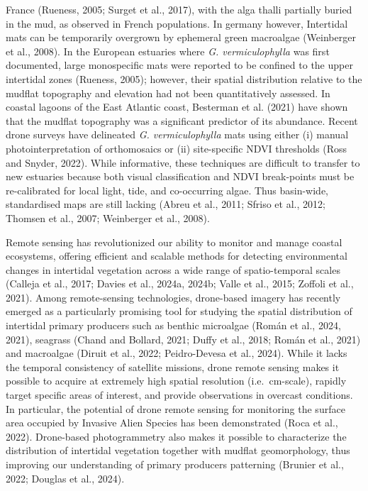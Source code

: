 \documentclass[
  letterpaper,
  DIV=11,
  numbers=noendperiod]{scrartcl}
\begin{document}
France (Rueness, 2005; Surget et al., 2017), with the alga thalli
partially buried in the mud, as observed in French populations. In
germany however, Intertidal mats can be temporarily overgrown by
ephemeral green macroalgae (Weinberger et al., 2008). In the European
estuaries where \emph{G. vermiculophylla} was first documented, large
monospecific mats were reported to be confined to the upper intertidal
zones (Rueness, 2005); however, their spatial distribution relative to
the mudflat topography and elevation had not been quantitatively
assessed. In coastal lagoons of the East Atlantic coast, Besterman et
al. (2021) have shown that the mudflat topography was a significant
predictor of its abundance. Recent drone surveys have delineated
\emph{G. vermiculophylla} mats using either (i) manual
photointerpretation of orthomosaics or (ii) site-specific NDVI
thresholds (Ross and Snyder, 2022). While informative, these techniques
are difficult to transfer to new estuaries because both visual
classification and NDVI break-points must be re-calibrated for local
light, tide, and co-occurring algae. Thus basin-wide, standardised maps
are still lacking (Abreu et al., 2011; Sfriso et al., 2012; Thomsen et
al., 2007; Weinberger et al., 2008).

Remote sensing has revolutionized our ability to monitor and manage
coastal ecosystems, offering efficient and scalable methods for
detecting environmental changes in intertidal vegetation across a wide
range of spatio-temporal scales (Calleja et al., 2017; Davies et al.,
2024a, 2024b; Valle et al., 2015; Zoffoli et al., 2021). Among
remote-sensing technologies, drone-based imagery has recently emerged as
a particularly promising tool for studying the spatial distribution of
intertidal primary producers such as benthic microalgae (Román et al.,
2024, 2021), seagrass (Chand and Bollard, 2021; Duffy et al., 2018;
Román et al., 2021) and macroalgae (Diruit et al., 2022; Peidro-Devesa
et al., 2024). While it lacks the temporal consistency of satellite
missions, drone remote sensing makes it possible to acquire at extremely
high spatial resolution (i.e.~cm-scale), rapidly target specific areas
of interest, and provide observations in overcast conditions. In
particular, the potential of drone remote sensing for monitoring the
surface area occupied by Invasive Alien Species has been demonstrated
(Roca et al., 2022). Drone-based photogrammetry also makes it possible
to characterize the distribution of intertidal vegetation together with
mudflat geomorphology, thus improving our understanding of primary
producers patterning (Brunier et al., 2022; Douglas et al., 2024).
\end{document}
